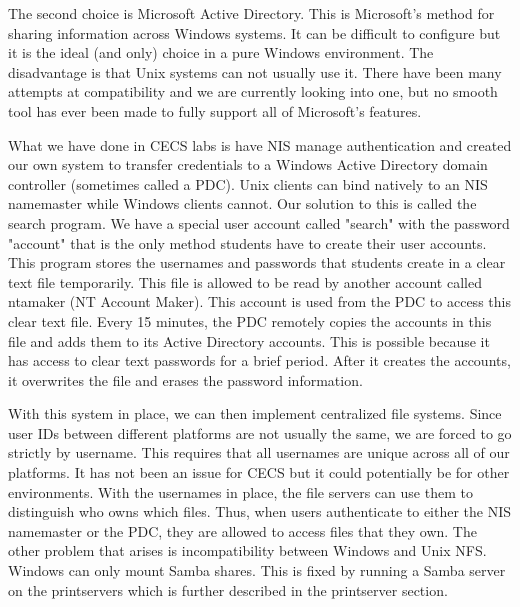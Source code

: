 The second choice is Microsoft Active Directory.  This is Microsoft's method for sharing information across Windows systems.  It can be difficult to configure but it is the ideal (and only) choice in a pure Windows environment.  The disadvantage is that Unix systems can not usually use it.  There have been many attempts at compatibility and we are currently looking into one, but no smooth tool has ever been made to fully support all of Microsoft's features.  

What we have done in CECS labs is have NIS manage authentication and created our own system to transfer credentials to a Windows Active Directory domain controller (sometimes called a PDC).  Unix clients can bind natively to an NIS namemaster while Windows clients cannot.  Our solution to this is called the search program.  We have a special user account called "search" with the password "account" that is the only method students have to create their user accounts.  This program stores the usernames and passwords that students create in a clear text file temporarily.  This file is allowed to be read by another account called ntamaker (NT Account Maker).  This account is used from the PDC to access this clear text file.  Every 15 minutes, the PDC remotely copies the accounts in this file and adds them to its Active Directory accounts.  This is possible because it has access to clear text passwords for a brief period.  After it creates the accounts, it overwrites the file and erases the password information.

With this system in place, we can then implement centralized file systems.  Since user IDs between different platforms are not usually the same, we are forced to go strictly by username.  This requires that all usernames are unique across all of our platforms.  It has not been an issue for CECS but it could potentially be for other environments.  With the usernames in place, the file servers can use them to distinguish who owns which files.  Thus, when users authenticate to either the NIS namemaster or the PDC, they are allowed to access files that they own.  The other problem that arises is incompatibility between Windows and Unix NFS.  Windows can only mount Samba shares.  This is fixed by running a Samba server on the printservers which is further described in the printserver section.  

